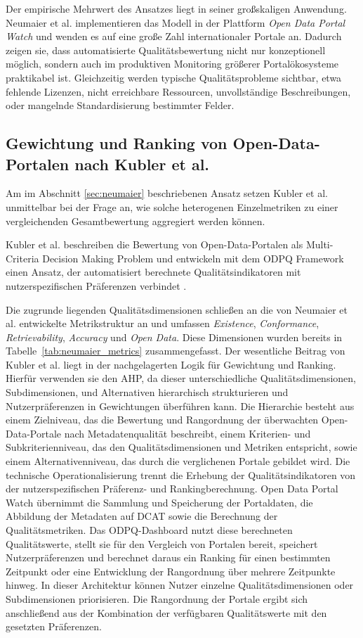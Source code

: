 Der empirische Mehrwert des Ansatzes liegt in seiner großskaligen Anwendung. Neumaier et al. implementieren das Modell in der Plattform \textit{Open Data Portal Watch} und wenden es auf eine große Zahl internationaler Portale an. Dadurch zeigen sie, dass automatisierte Qualitätsbewertung nicht nur konzeptionell möglich, sondern auch im produktiven Monitoring größerer Portalökosysteme praktikabel ist. Gleichzeitig werden typische Qualitätsprobleme sichtbar, etwa fehlende Lizenzen, nicht erreichbare Ressourcen, unvollständige Beschreibungen, oder mangelnde Standardisierung bestimmter Felder.

\subsection{Gewichtung und Ranking von Open-Data-Portalen nach Kubler et al.}

Am im Abschnitt \ref{sec:neumaier} beschriebenen Ansatz setzen Kubler et al. unmittelbar bei der Frage an, wie solche heterogenen Einzelmetriken zu einer vergleichenden Gesamtbewertung aggregiert werden können.

Kubler et al. beschreiben die Bewertung von Open-Data-Portalen als Multi-Criteria Decision Making Problem und entwickeln mit dem \acrfull{ODPQ} Framework einen Ansatz, der automatisiert berechnete Qualitätsindikatoren mit nutzerspezifischen Präferenzen verbindet \cite{kubler2018comparison}.

Die zugrunde liegenden Qualitätsdimensionen schließen an die von Neumaier et al. entwickelte Metrikstruktur an und umfassen \textit{Existence}, \textit{Conformance}, \textit{Retrievability}, \textit{Accuracy} und \textit{Open Data}. Diese Dimensionen wurden bereits in Tabelle~\ref{tab:neumaier_metrics} zusammengefasst.
Der wesentliche Beitrag von Kubler et al. liegt in der nachgelagerten Logik für Gewichtung und Ranking.
Hierfür verwenden sie den \acrfull{AHP}, da dieser unterschiedliche Qualitätsdimensionen, Subdimensionen, und Alternativen hierarchisch strukturieren und Nutzerpräferenzen in Gewichtungen überführen kann. 
Die Hierarchie besteht aus einem Zielniveau, das die Bewertung und Rangordnung der überwachten Open-Data-Portale nach Metadatenqualität beschreibt, einem Kriterien- und Subkriterienniveau, das den Qualitätsdimensionen und Metriken entspricht, sowie einem Alternativenniveau, das durch die verglichenen Portale gebildet wird.
Die technische Operationalisierung trennt die Erhebung der Qualitätsindikatoren von der nutzerspezifischen Präferenz- und Rankingberechnung.
Open Data Portal Watch übernimmt die Sammlung und Speicherung der Portaldaten, die Abbildung der Metadaten auf DCAT sowie die Berechnung der Qualitätsmetriken.
Das ODPQ-Dashboard nutzt diese berechneten Qualitätswerte, stellt sie für den Vergleich von Portalen bereit, speichert Nutzerpräferenzen und berechnet daraus ein Ranking für einen bestimmten Zeitpunkt oder eine Entwicklung der Rangordnung über mehrere Zeitpunkte hinweg.
In dieser Architektur können Nutzer einzelne Qualitätsdimensionen oder Subdimensionen priorisieren. Die Rangordnung der Portale ergibt sich anschließend aus der Kombination der verfügbaren Qualitätswerte mit den gesetzten Präferenzen. \cite{kubler2018comparison}

